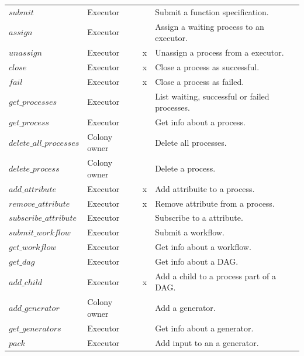 \documentclass{article}
\begin{document}
\begin{table}[h]
\begin{tabular}{llcl}
        \(submit\)                 & Executor     &            & Submit a function specification. \\
        \(assign\)                 & Executor     &            & Assign a waiting process to an executor. \\
        \(unassign\)               & Executor     & x          & Unassign a process from a executor. \\
        \(close\)                  & Executor     & x          & Close a process as successful. \\
        \(fail\)                   & Executor     & x          & Close a process as failed. \\
        \(get\_processes\)         & Executor     &            & List waiting, successful or failed processes. \\
        \(get\_process\)           & Executor     &            & Get info about a process. \\
        \(delete\_all\_processes\) & Colony owner &            & Delete all processes. \\
        \(delete\_process\)        & Colony owner &            & Delete a process. \\
        \(add\_attribute\)         & Executor     & x          & Add attribuite to a process. \\
        \(remove\_attribute\)      & Executor     & x          & Remove attribute from a process. \\
        \(subscribe\_attribute\)   & Executor     &            & Subscribe to a attribute. \\
        \(submit\_workflow\)       & Executor     &            & Submit a workflow. \\
        \(get\_workflow\)          & Executor     &            & Get info about a workflow. \\
        \(get\_dag\)               & Executor     &            & Get info about a DAG. \\
        \(add\_child\)             & Executor     & x          & Add a child to a process part of a DAG. \\
        \(add\_generator\)         & Colony owner &            & Add a generator. \\
        \(get\_generators\)        & Executor     &            & Get info about a generator. \\
        \(pack\)                   & Executor     &            & Add input to an a generator. \\

\end{tabular}
\end{table}
\end{document}
